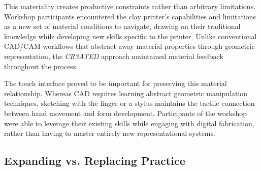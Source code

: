 \vspace{0.5cm}

This materiality creates productive constraints rather than arbitrary limitations. Workshop participants encountered the clay printer's capabilities and limitations as a new set of material conditions to navigate, drawing on their traditional knowledge while developing new skills specific to the printer. Unlike conventional CAD/CAM workflows that abstract away material properties through geometric representation, the \textit{CR3ATED} approach maintained material feedback throughout the process.

\vspace{0.5cm}

The touch interface proved to be important for preserving this material relationship. Whereas CAD requires learning abstract geometric manipulation techniques, sketching with the finger or a stylus maintains the tactile connection between hand movement and form development. Participants of the workshop were able to leverage their existing skills while engaging with digital fabrication, rather than having to master entirely new representational systems.

\subsection{Expanding vs. Replacing Practice}














